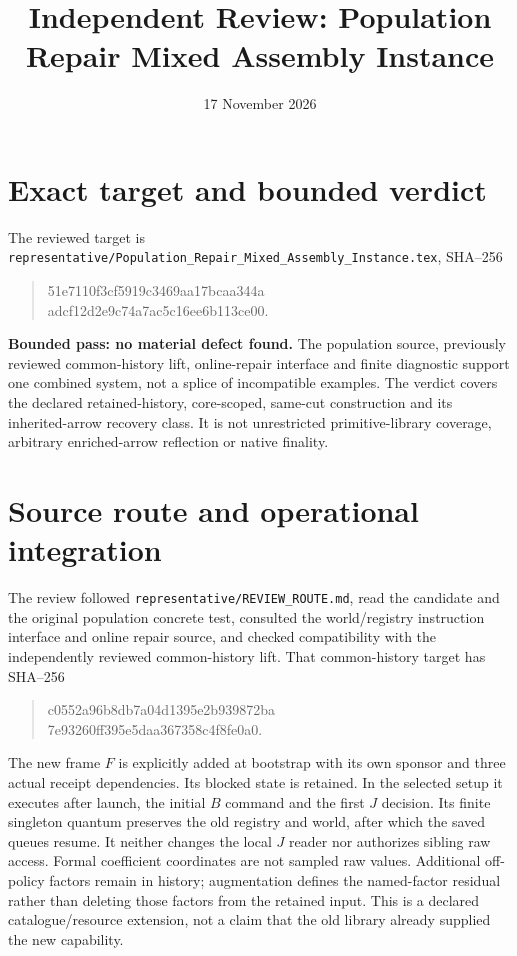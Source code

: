 \documentclass{article}
\title{Independent Review: Population Repair Mixed Assembly Instance}
\date{17 November 2026}
\begin{document}
\maketitle
\section*{Exact target and bounded verdict}
The reviewed target is \texttt{representative/Population\_Repair\_Mixed\_Assembly\_Instance.tex}, SHA--256
\begin{quote}\ttfamily\small
51e7110f3cf5919c3469aa17bcaa344a\\adcf12d2e9c74a7ac5c16ee6b113ce00.
\end{quote}
\textbf{Bounded pass: no material defect found.} The population source, previously reviewed common-history lift, online-repair interface and finite diagnostic support one combined system, not a splice of incompatible examples. The verdict covers the declared retained-history, core-scoped, same-cut construction and its inherited-arrow recovery class. It is not unrestricted primitive-library coverage, arbitrary enriched-arrow reflection or native finality.

\section*{Source route and operational integration}
The review followed \texttt{representative/REVIEW\_ROUTE.md}, read the candidate and the original population concrete test, consulted the world/registry instruction interface and online repair source, and checked compatibility with the independently reviewed common-history lift. That common-history target has SHA--256
\begin{quote}\ttfamily\small
c0552a96b8db7a04d1395e2b939872ba\\7e93260ff395e5daa367358c4f8fe0a0.
\end{quote}
The new frame $F$ is explicitly added at bootstrap with its own sponsor and three actual receipt dependencies. Its blocked state is retained. In the selected setup it executes after launch, the initial $B$ command and the first $J$ decision. Its finite singleton quantum preserves the old registry and world, after which the saved queues resume. It neither changes the local $J$ reader nor authorizes sibling raw access. Formal coefficient coordinates are not sampled raw values. Additional off-policy factors remain in history; augmentation defines the named-factor residual rather than deleting those factors from the retained input. This is a declared catalogue/resource extension, not a claim that the old library already supplied the new capability.
\end{document}

